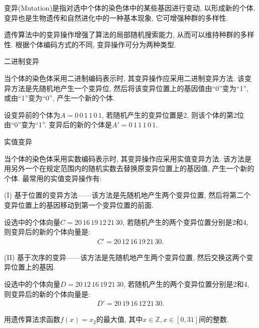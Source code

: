  变异(Mutation)是指对选中个体的染色体中的某些基因进行变动, 以形成新的个体.
 变异也是生物遗传和自然进化中的一种基本现象, 它可增强种群的多样性.

 遗传算法中的变异操作增强了算法的局部随机搜索能力, 从而可以维持种群的多样性. 根据个体编码方式的不同, 变异操作可分为两种类型.

  二进制变异

 当个体的染色体采用二进制编码表示时, 其变异操作应采用二进制变异方法. 该变异方法是先随机地产生一个变异位, 然后将该变异位置上的基因值由“0”变为“1”, 或由“1”变为“0”, 产生一个新的个体.

\begin{example}
设变异前的个体为$A=0\, 0 \, 1\,  1\,  0 \, 1$, 若随机产生的变异位置是2, 则该个体的第2位由“0”变为“1”.
变异后的新的个体是$A'= 0\,  1\,  1\,  1\,  0 \, 1$.
\end{example}

 实值变异

 当个体的染色体采用实数编码表示时, 其变异操作应采用实值变异方法. 该方法是用另外一个在规定范围内的随机实数去替换原变异位置上的基因值, 产生一个新的个体. 最常用的实值变异操作有:

(I) 基于位置的变异方法——该方法是先随机地产生两个变异位置, 然后将第二个变异位置上的基因移动到第一个变异位置的前面.

\begin{example}
设选中的个体向量$C=20\,  16\,  19\,  12\,  21\,  30$, 若随机产生的两个变异位置分别是2和4, 则变异后的新的个体向量是:
\begin{align*}
    C'= 20\,  12 \, 16 \, 19\,  21\,  30.
\end{align*}
\vspace{-0.4cm}
\end{example}

(II) 基于次序的变异——该方法是先随机地产生两个变异位置, 然后交换这两个变异位置上的基因.

\begin{example}
    设选中的个体向量$D=20\,  12 \, 16 \, 19\,  21\,  30$, 若随机产生的两个变异位置分别是2和4, 则变异后的新的个体向量是:
\begin{align*}
    D'= 20\,  19\,  16\,  12 \, 21 \, 30.
\end{align*}
\vspace{-0.4cm}
\end{example}

\begin{example}
    用遗传算法求函数$f(x)=x_2$的最大值, 其中$x\in \mathbb Z, x\in [0,31]$间的整数.
\end{example}


